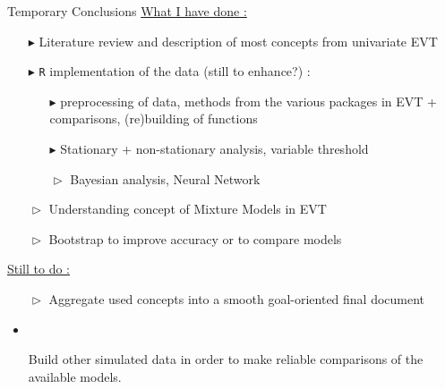 \documentclass[9pt,xcolor={dvipsnames}]{beamer}
\begin{document}
\begin{frame}{Temporary Conclusions}
	\underline{What I have done : }
	\begin{itemize}
		\item[$\blacktriangleright$] Literature review and description of most concepts from univariate EVT
		\item[$\blacktriangleright$] \texttt{R} implementation of the data (still to enhance?) : 
		\begin{itemize} 	\fontsize{7}{7}\selectfont
			\item[$\blacktriangleright$] preprocessing of data,  methods from the various packages in EVT + comparisons,  (re)building of functions
			\item[$\blacktriangleright$] Stationary + non-stationary analysis, variable threshold
			\item[$\vartriangleright$] Bayesian analysis, Neural Network
		\end{itemize}
		\item[$\vartriangleright$] Understanding concept of Mixture Models in EVT
		\item[$\vartriangleright$] Bootstrap to improve accuracy or to compare models
	\end{itemize}
	
\underline{Still to do :}
\vspace{-.1cm}
\begin{itemize}
	\item[$\vartriangleright$] Aggregate used concepts into a smooth goal-oriented final document  
		\vspace{-.3cm}
\item\item[{\fontfamily{cyklop}\fontsize{6}{6}\selectfont \boxed{\textit{?}}}] Build other simulated data in order to make reliable comparisons of the available models.
	\end{itemize}
	
	
\end{frame}

\appendix
	\thispagestyle{empty}
\begin{frame}[allowframebreaks]


\end{frame}
	\thispagestyle{empty}
\end{document}
